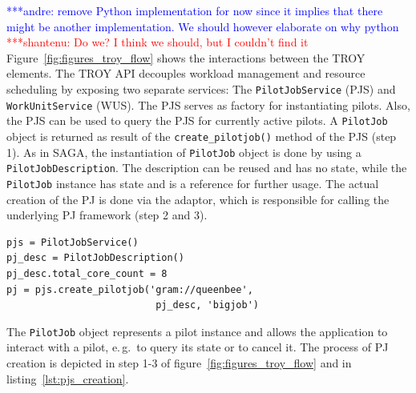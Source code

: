 \documentclass[conference,final]{IEEEtran}
\newcommand{\jhanote}[1]{ {\textcolor{red} { ***shantenu: #1 }}}
\newcommand{\alnote}[1]{ {\textcolor{blue} { ***andre: #1 }}}
\newcommand{\alnote}[1]{}
\newcommand{\jhanote}[1]{}
\newcommand{\upp}{\vspace*{-0.5em}}
\begin{document}

\alnote{remove Python implementation for now since it implies that there might
be another implementation. We should however elaborate on why python}\jhanote{Do
we? I think we should, but I couldn't find it}
Figure~\ref{fig:figures_troy_flow} shows the interactions between the TROY
elements. The TROY API decouples workload management and resource scheduling by
exposing two separate services: The \texttt{PilotJobService} (PJS) and
\texttt{WorkUnitService} (WUS). The PJS serves as factory for instantiating
pilots. Also, the PJS can be used to query the PJS for currently active pilots.
A \texttt{PilotJob} object is returned as result of the
\texttt{create\_pilotjob()} method of the PJS (step 1). As in SAGA, the
instantiation of \texttt{PilotJob} object is done by using a
\texttt{PilotJobDescription}. The description can be reused and has no state,
while the \texttt{PilotJob} instance has state and is a reference for further
usage. The actual creation of the PJ is done via the adaptor, which is
responsible for calling the underlying PJ framework (step 2 and 3).

\lstset{
language=Python,
frame=single,
captionpos=b,
stringstyle=\ttfamily,
basicstyle=\scriptsize\ttfamily
}

\noindent\begin{minipage}{0.47 \textwidth}
\begin{lstlisting}[caption={\textbf{PilotJob Creation:} Instantiation of a Pilot Job Service using a Pilot Job Description.}, label={lst:pjs_creation}]
pjs = PilotJobService()
pj_desc = PilotJobDescription()
pj_desc.total_core_count = 8
pj = pjs.create_pilotjob('gram://queenbee', 
                          pj_desc, 'bigjob')
\end{lstlisting}
\end{minipage}

The \texttt{PilotJob} object represents a pilot instance and allows the 
application to interact with a pilot, e.\,g.\ to query its state or to cancel 
it. The process of PJ creation is depicted in step 1-3 of 
figure~\ref{fig:figures_troy_flow} and in listing~\ref{lst:pjs_creation}.
\end{document}
